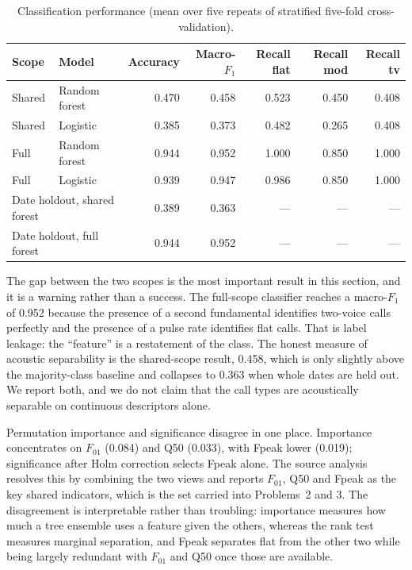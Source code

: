 \begin{table}[htbp]
  \centering
  \caption{Classification performance (mean over five repeats of stratified five-fold
  cross-validation).}\label{tab:q1-cv}
  \small
  \begin{tabular}{llrrrrr}
    \toprule
    Scope & Model & Accuracy & Macro-$F_1$ & Recall flat & Recall mod & Recall tv \\
    \midrule
    Shared & Random forest & 0.470 & 0.458 & 0.523 & 0.450 & 0.408 \\
    Shared & Logistic & 0.385 & 0.373 & 0.482 & 0.265 & 0.408 \\
    Full & Random forest & 0.944 & 0.952 & 1.000 & 0.850 & 1.000 \\
    Full & Logistic & 0.939 & 0.947 & 0.986 & 0.850 & 1.000 \\
    \midrule
    \multicolumn{2}{l}{Date holdout, shared forest} & 0.389 & 0.363 & --- & --- & --- \\
    \multicolumn{2}{l}{Date holdout, full forest} & 0.944 & 0.952 & --- & --- & --- \\
    \bottomrule
  \end{tabular}
\end{table}

The gap between the two scopes is the most important result in this section, and it is a warning
rather than a success. The full-scope classifier reaches a macro-$F_1$ of 0.952 because the
presence of a second fundamental identifies two-voice calls perfectly and the presence of a pulse
rate identifies flat calls. That is label leakage: the ``feature'' is a restatement of the class.
The honest measure of acoustic separability is the shared-scope result, 0.458, which is only
slightly above the majority-class baseline and collapses to 0.363 when whole dates are held out.
We report both, and we do not claim that the call types are acoustically separable on continuous
descriptors alone.

Permutation importance and significance disagree in one place. Importance concentrates on
$F_{01}$ (0.084) and Q50 (0.033), with Fpeak lower (0.019); significance after Holm correction
selects Fpeak alone. The source analysis resolves this by combining the two views and reports
$F_{01}$, Q50 and Fpeak as the key shared indicators, which is the set carried into
Problems~2 and 3. The disagreement is interpretable rather than troubling: importance measures
how much a tree ensemble uses a feature given the others, whereas the rank test measures marginal
separation, and Fpeak separates flat from the other two while being largely redundant with
$F_{01}$ and Q50 once those are available.

